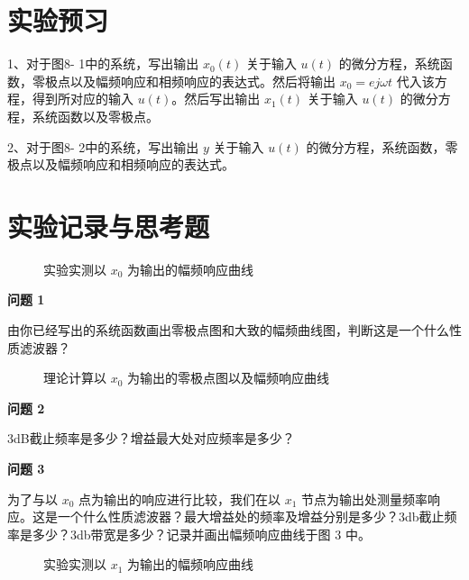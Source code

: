 \documentclass{sasreport}
\begin{document}
\maketitle

\section{实验预习}
1、对于图8- 1中的系统，写出输出 $x_0(t)$ 关于输入 $u(t)$ 的微分方程，系统函数，零极点以及幅频响应和相频响应的表达式。然后将输出 $x_0 = ej\omega t$ 代入该方程，得到所对应的输入 $u(t)$。然后写出输出 $x_1(t)$ 关于输入 $u(t)$ 的微分方程，系统函数以及零极点。

2、对于图8- 2中的系统，写出输出 $y$ 关于输入 $u(t)$ 的微分方程，系统函数，零极点以及幅频响应和相频响应的表达式。

\section{实验记录与思考题}
\begin{figure}[H]
    \caption{实验实测以 $x_0$ 为输出的幅频响应曲线}
    \centering

\end{figure}

\textbf{问题 1}

由你已经写出的系统函数画出零极点图和大致的幅频曲线图，判断这是一个什么性质滤波器？

\begin{figure}[H]
    \caption{理论计算以 $x_0$ 为输出的零极点图以及幅频响应曲线}
    \centering

\end{figure}

\textbf{问题 2}

3dB截止频率是多少？增益最大处对应频率是多少？

\textbf{问题 3}

为了与以 $x_0$ 点为输出的响应进行比较，我们在以 $x_1$ 节点为输出处测量频率响应。这是一个什么性质滤波器？最大增益处的频率及增益分别是多少？3db截止频率是多少？3db带宽是多少？记录并画出幅频响应曲线于图 3 中。

\begin{figure}[H]
    \caption{实验实测以 $x_1$ 为输出的幅频响应曲线}
    \centering

\end{figure}
\end{document}
